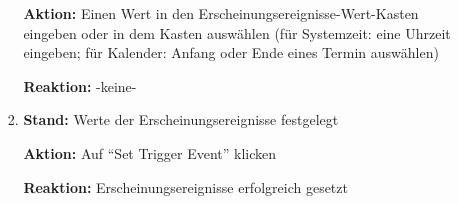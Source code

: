 \documentclass[a4paper]{scrreprt}
\begin{document}
\begin{itemize}
\begin{itemize}
\begin{enumerate}
		                	\par \textbf{Aktion: }Einen Wert in den Erscheinungsereignisse-Wert-Kasten eingeben oder in dem Kasten auswählen (für Systemzeit: eine Uhrzeit eingeben; für Kalender: Anfang oder Ende eines Termin auswählen)
		                	\par \textbf{Reaktion: }-keine-
		                	\item \par \textbf{Stand: }Werte der Erscheinungsereignisse festgelegt
		                	\par \textbf{Aktion: }Auf ``Set Trigger Event'' klicken
		                	\par \textbf{Reaktion: }Erscheinungsereignisse erfolgreich gesetzt
		                \end{enumerate}
                \end{itemize}


\end{itemize}
\end{document}
